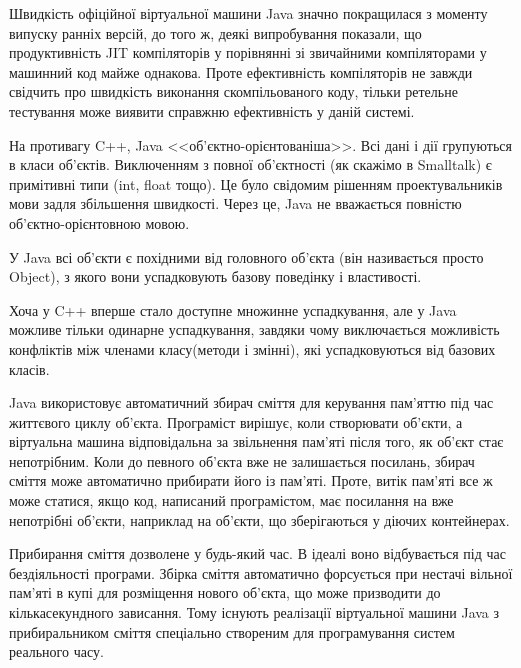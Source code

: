 \par Швидкість офіційної віртуальної машини Java значно покращилася з моменту випуску ранніх версій, до того ж, деякі випробування показали, що продуктивність JIT компіляторів у порівнянні зі звичайними компіляторами у машинний код майже однакова. Проте ефективність компіляторів не завжди свідчить про швидкість виконання скомпільованого коду, тільки ретельне тестування може виявити справжню ефективність у даній системі.

\par На противагу C++, Java <<об'єктно-орієнтованіша>>. Всі дані і дії групуються в класи об'єктів. Виключенням з повної об'єктності (як скажімо в Smalltalk) є примітивні типи (int, float тощо). Це було свідомим рішенням проектувальників мови задля збільшення швидкості. Через це, Java не вважається повністю об'єктно-орієнтовною мовою.
\par У Java всі об'єкти є похідними від головного об'єкта (він називається просто Object), з якого вони успадковують базову поведінку і властивості.
\par Хоча у C++ вперше стало доступне множинне успадкування, але у Java можливе тільки одинарне успадкування, завдяки чому виключається можливість конфліктів між членами класу(методи і змінні), які успадковуються від базових класів.

\par Java використовує автоматичний збирач сміття для керування пам'яттю під час життєвого циклу об'єкта. Програміст вирішує, коли створювати об'єкти, а віртуальна машина відповідальна за звільнення пам'яті після того, як об'єкт стає непотрібним. Коли до певного об'єкта вже не залишається посилань, збирач сміття може автоматично прибирати його із пам'яті. Проте, витік пам'яті все ж може статися, якщо код, написаний програмістом, має посилання на вже непотрібні об'єкти, наприклад на об'єкти, що зберігаються у діючих контейнерах.
\par Прибирання сміття дозволене у будь-який час. В ідеалі воно відбувається під час бездіяльності програми. Збірка сміття автоматично форсується при нестачі вільної пам'яті в купі для розміщення нового об'єкта, що може призводити до кількасекундного зависання. Тому існують реалізації віртуальної машини Java з прибиральником сміття спеціально створеним для програмування систем реального часу.

